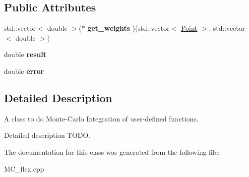 \subsection*{Public Attributes}
\begin{DoxyCompactItemize}
\item 
\mbox{\label{class_m_c__integrate_a413afb40ea20a176cf507bfa930619a3}} 
std\+::vector$<$ double $>$($\ast$ {\bfseries get\+\_\+weights} )(std\+::vector$<$ \hyperlink{class_point}{Point} $>$, std\+::vector$<$ double $>$)
\item 
\mbox{\label{class_m_c__integrate_a4fd22a063b4f10b16dd947200cb8d0f0}} 
double {\bfseries result}
\item 
\mbox{\label{class_m_c__integrate_a912158b0f9f05889d97376dfa6a1524d}} 
double {\bfseries error}
\end{DoxyCompactItemize}


\subsection{Detailed Description}
A class to do Monte-\/\+Carlo Integration of user-\/defined functions. 

Detailed description T\+O\+DO. 

The documentation for this class was generated from the following file\+:\begin{DoxyCompactItemize}
\item 
M\+C\+\_\+flex.\+cpp\end{DoxyCompactItemize}
